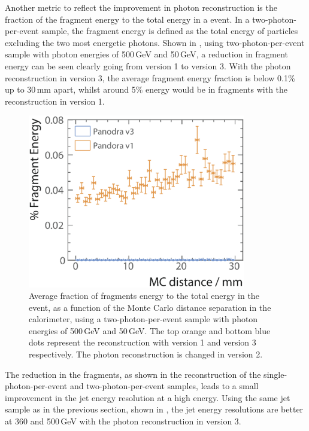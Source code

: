 Another metric to reflect the improvement in photon reconstruction is the fraction of the fragment energy to the total energy in a event. In a two-photon-per-event sample, the fragment energy is defined as the total energy of particles excluding the two most energetic photons. Shown in , using two-photon-per-event sample with photon energies of  500\,GeV and 50\,GeV, a reduction in fragment energy can be seen clearly going from \pandora version 1 to version 3. With the photon reconstruction in \pandora version 3, the average fragment energy fraction is below 0.1\% up to 30\,mm apart, whilst around 5\% energy would be in fragments with the reconstruction in \pandora version 1.
\begin{figure}[tbph]
\centering
\includegraphics[width=0.85\textwidth]{photon/DoubleCompareFragEnergy2}
\caption[Average fraction fragments energy to the total energy, as a function of the MC distance separation]
{Average fraction of fragments energy to the total energy  in the event, as a function of the Monte Carlo distance separation in the calorimeter, using a two-photon-per-event sample with photon energies of  500\,GeV and 50\,GeV. The top orange and bottom blue dots represent the reconstruction with \pandora version 1 and version 3 respectively. The photon reconstruction is changed in \pandora version 2.}
\label{fig:photonDoubleFragEnergy}
\end{figure}




The reduction in the fragments, as shown in the reconstruction of the single-photon-per-event and two-photon-per-event samples, leads to a small improvement in the jet energy resolution at a high energy. Using the same jet sample as in the previous section, shown in , the jet energy resolutions are better at 360 and 500\,GeV with the  photon reconstruction in \pandora version 3.

